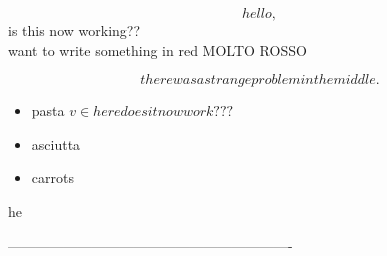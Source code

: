 \[ hello, \] is this now working?? \\ want to write something in red {\color{red} MOLTO ROSSO }

\[
there was a strange problem in the middle.    
\]

\begin{itemize}

\item pasta $v \in here does it now work???$
\item asciutta

\item carrots
\end{itemize} he

-------------------------------------------------------------

